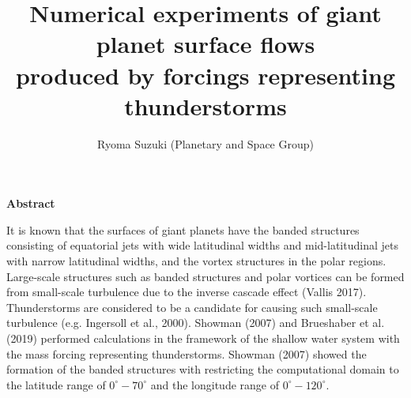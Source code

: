 \documentclass[a4j,8pt]{jarticle}
\begin{document}
\pagestyle{empty} 
\title{\Large Numerical experiments of giant planet surface flows  \\
produced by forcings representing thunderstorms
}

\author{\large Ryoma Suzuki (Planetary and Space Group)}
\date{}
\maketitle
\begin{center}
\bf \large Abstract
\end{center}
%
It is known that the surfaces of giant planets have
the banded structures consisting of equatorial jets with wide latitudinal widths
and mid-latitudinal jets with narrow latitudinal widths, and
the vortex structures in the polar regions.
%
Large-scale structures such as banded structures and polar vortices
can be formed from small-scale turbulence due to the inverse cascade effect (Vallis 2017).
Thunderstorms are considered to be
a candidate for causing such small-scale turbulence (e.g. Ingersoll et al., 2000).
%
Showman (2007) and Brueshaber et al. (2019) performed calculations 
in the framework of the shallow water system
with the mass forcing representing thunderstorms.
%
%
Showman (2007) showed the formation of the banded structures 
with restricting the computational domain to the latitude range of
$0^\circ - 70^\circ$ and the longitude range of $0^\circ - 120^\circ$.
\end{document}

